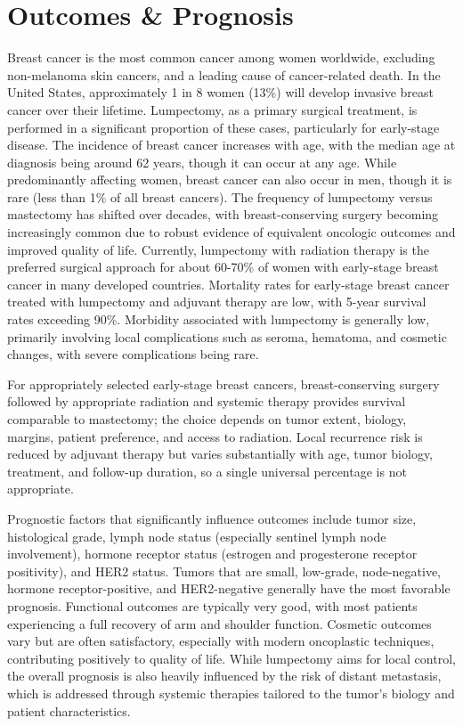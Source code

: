 \section*{Outcomes \& Prognosis}
Breast cancer is the most common cancer among women worldwide, excluding non-melanoma skin cancers, and a leading cause of cancer-related death. In the United States, approximately 1 in 8 women (13\%) will develop invasive breast cancer over their lifetime. Lumpectomy, as a primary surgical treatment, is performed in a significant proportion of these cases, particularly for early-stage disease. The incidence of breast cancer increases with age, with the median age at diagnosis being around 62 years, though it can occur at any age. While predominantly affecting women, breast cancer can also occur in men, though it is rare (less than 1\% of all breast cancers). The frequency of lumpectomy versus mastectomy has shifted over decades, with breast-conserving surgery becoming increasingly common due to robust evidence of equivalent oncologic outcomes and improved quality of life. Currently, lumpectomy with radiation therapy is the preferred surgical approach for about 60-70\% of women with early-stage breast cancer in many developed countries. Mortality rates for early-stage breast cancer treated with lumpectomy and adjuvant therapy are low, with 5-year survival rates exceeding 90\%. Morbidity associated with lumpectomy is generally low, primarily involving local complications such as seroma, hematoma, and cosmetic changes, with severe complications being rare.

For appropriately selected early-stage breast cancers, breast-conserving surgery followed by appropriate radiation and systemic therapy provides survival comparable to mastectomy; the choice depends on tumor extent, biology, margins, patient preference, and access to radiation. Local recurrence risk is reduced by adjuvant therapy but varies substantially with age, tumor biology, treatment, and follow-up duration, so a single universal percentage is not appropriate.

Prognostic factors that significantly influence outcomes include tumor size, histological grade, lymph node status (especially sentinel lymph node involvement), hormone receptor status (estrogen and progesterone receptor positivity), and HER2 status. Tumors that are small, low-grade, node-negative, hormone receptor-positive, and HER2-negative generally have the most favorable prognosis. Functional outcomes are typically very good, with most patients experiencing a full recovery of arm and shoulder function. Cosmetic outcomes vary but are often satisfactory, especially with modern oncoplastic techniques, contributing positively to quality of life. While lumpectomy aims for local control, the overall prognosis is also heavily influenced by the risk of distant metastasis, which is addressed through systemic therapies tailored to the tumor's biology and patient characteristics.

